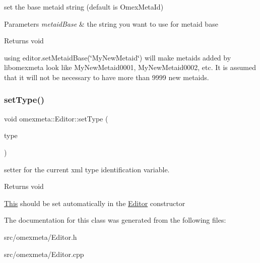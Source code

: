 set the base metaid string (default is Omex\+Meta\+Id) 


\begin{DoxyParams}{Parameters}
{\em metaid\+Base} & the string you want to use for metaid base \\
\hline
\end{DoxyParams}
\begin{DoxyReturn}{Returns}
void
\end{DoxyReturn}
using editor.\+set\+Metaid\+Base(\char`\"{}\+My\+New\+Metaid\char`\"{}) will make metaids added by libomexmeta look like My\+New\+Metaid0001, My\+New\+Metaid0002, etc. It is assumed that it will not be necessary to have more than 9999 new metaids. \mbox{\label{classomexmeta_1_1Editor_a3e2c493ed5034a15e6915b7b649b58a3}} 
\subsubsection{\texorpdfstring{set\+Type()}{setType()}}
{\footnotesize\ttfamily void omexmeta\+::\+Editor\+::set\+Type (\begin{DoxyParamCaption}\item[{Omex\+Meta\+Xml\+Type}]{type }\end{DoxyParamCaption})}



setter for the current xml type identification variable. 

\begin{DoxyReturn}{Returns}
void
\end{DoxyReturn}
\hyperlink{classThis}{This} should be set automatically in the \hyperlink{classomexmeta_1_1Editor}{Editor} constructor 

The documentation for this class was generated from the following files\+:\begin{DoxyCompactItemize}
\item 
src/omexmeta/Editor.\+h\item 
src/omexmeta/Editor.\+cpp\end{DoxyCompactItemize}
